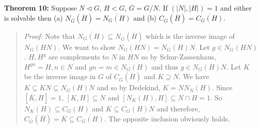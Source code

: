 {\bf Theorem 10:}  Suppose $N \lhd G$, $H < G$, ${\overline G}= G/N$.  If $(|N|, |H|)=1$
and either is solvable then 
(a) $N_{{\overline G}}({\overline H}) = {\overline {N_G(H)}}$ and
(b) $C_{{\overline G}}({\overline H}) = {\overline {C_G(H)}}$.
\begin{quote}
\emph{Proof:} 
Note that ${\overline {N_G(H)}} \subseteq N_{\overline G}({\overline H})$ which is the
inverse image of $N_G(HN)$.  We want to show $N_G(HN)= N_G(H)N$.
Let $g \in N_G(HN)$.  $H, H^g$ are complements to $N$ in $HN$ so by Schur-Zassenhaus,
$H^{gn}=H, n \in N$ and $gn=m \in N_G(H)$ and thus $g \in N_G(H)N$.  Let $K$ be the
inverse image in $G$ of $C_{\overline G}({\overline H})$ and $K \supseteq N$.
We have $K \subseteq KN \subseteq N_G(H)N$ and so by Dedekind, $K=N N_N(H)$.
Since $[ {\overline K}, {\overline H}]= 1$, $[K, H] \subseteq N$ and
$[N_K(H), H] \subseteq N \cap H = 1$.  So $N_K(H) \subseteq C_G(H)$ and
$K \subseteq C_G(H)N$ and therefore,
$C_{\overline G}({\overline H})= {\overline K} \subseteq {\overline {C_G(H)}}$.  The
opposite inclusion obviously holds.
\end{quote}
